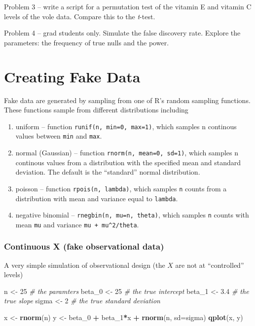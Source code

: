 \documentclass[]{book}
\newenvironment{Shaded}{\begin{snugshade}}{\end{snugshade}}
\newcommand{\KeywordTok}[1]{\textcolor[rgb]{0.13,0.29,0.53}{\textbf{#1}}}
\newcommand{\DataTypeTok}[1]{\textcolor[rgb]{0.13,0.29,0.53}{#1}}
\newcommand{\DecValTok}[1]{\textcolor[rgb]{0.00,0.00,0.81}{#1}}
\newcommand{\FloatTok}[1]{\textcolor[rgb]{0.00,0.00,0.81}{#1}}
\newcommand{\StringTok}[1]{\textcolor[rgb]{0.31,0.60,0.02}{#1}}
\newcommand{\CommentTok}[1]{\textcolor[rgb]{0.56,0.35,0.01}{\textit{#1}}}
\newcommand{\OperatorTok}[1]{\textcolor[rgb]{0.81,0.36,0.00}{\textbf{#1}}}
\newcommand{\NormalTok}[1]{#1}
\providecommand{\tightlist}{%
  \setlength{\itemsep}{0pt}\setlength{\parskip}{0pt}}
\begin{document}
Problem 3 -- write a script for a permutation test of the vitamin E and
vitamin C levels of the vole data. Compare this to the \emph{t}-test.

Problem 4 -- grad students only. Simulate the false discovery rate.
Explore the parameters: the frequency of true nulls and the power.

\chapter{Creating Fake Data}\label{creating-fake-data}

Fake data are generated by sampling from one of R's random sampling
functions. These functions sample from different distributions including

\begin{enumerate}
\def\labelenumi{\arabic{enumi}.}
\tightlist
\item
  uniform -- function \texttt{runif(n,\ min=0,\ max=1)}, which samples n
  continous values between \texttt{min} and \texttt{max}.
\item
  normal (Gaussian) -- function \texttt{rnorm(n,\ mean=0,\ sd=1)}, which
  samples n continous values from a distribution with the specified mean
  and standard deviation. The default is the ``standard'' normal
  distribution.
\item
  poisson -- function \texttt{rpois(n,\ lambda)}, which samples
  \texttt{n} counts from a distribution with mean and variance equal to
  \texttt{lambda}.
\item
  negative binomial -- \texttt{rnegbin(n,\ mu=n,\ theta)}, which samples
  \texttt{n} counts with mean \texttt{mu} and variance
  \texttt{mu\ +\ mu\^{}2/theta}.
\end{enumerate}

\subsection{Continuous X (fake observational
data)}\label{continuous-x-fake-observational-data}

A very simple simulation of observational design (the \(X\) are not at
``controlled'' levels)

\begin{Shaded}
\begin{Highlighting}[]
\NormalTok{n <-}\StringTok{ }\DecValTok{25}
\CommentTok{# the paramters}
\NormalTok{beta_}\DecValTok{0}\NormalTok{ <-}\StringTok{ }\DecValTok{25} \CommentTok{# the true intercept}
\NormalTok{beta_}\DecValTok{1}\NormalTok{ <-}\StringTok{ }\FloatTok{3.4} \CommentTok{# the true slope}
\NormalTok{sigma <-}\StringTok{ }\DecValTok{2} \CommentTok{# the true standard deviation}

\NormalTok{x <-}\StringTok{ }\KeywordTok{rnorm}\NormalTok{(n)}
\NormalTok{y <-}\StringTok{ }\NormalTok{beta_}\DecValTok{0} \OperatorTok{+}\StringTok{ }\NormalTok{beta_}\DecValTok{1}\OperatorTok{*}\NormalTok{x }\OperatorTok{+}\StringTok{ }\KeywordTok{rnorm}\NormalTok{(n, }\DataTypeTok{sd=}\NormalTok{sigma)}
\KeywordTok{qplot}\NormalTok{(x, y)}
\end{Highlighting}
\end{Shaded}
\end{document}
